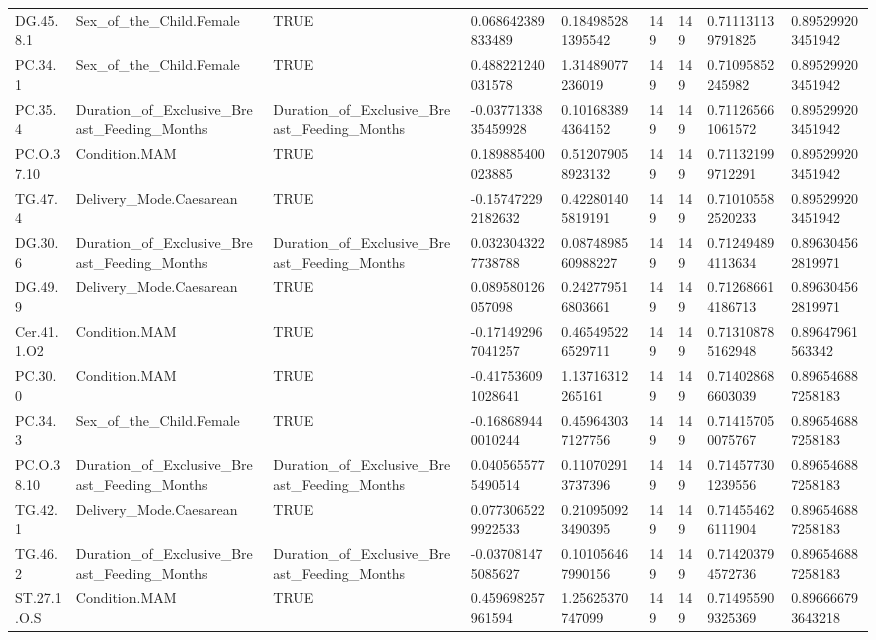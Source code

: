 \begin{longtable}{lllllllll}
DG.45.8.1 & Sex\_of\_the\_Child.Female & TRUE & 0.068642389833489 & 0.184985281395542 & 149 & 149 & 0.711131139791825 & 0.895299203451942 \\
PC.34.1 & Sex\_of\_the\_Child.Female & TRUE & 0.488221240031578 & 1.31489077236019 & 149 & 149 & 0.71095852245982 & 0.895299203451942 \\
PC.35.4 & Duration\_of\_Exclusive\_Breast\_Feeding\_Months & Duration\_of\_Exclusive\_Breast\_Feeding\_Months & -0.0377133835459928 & 0.101683894364152 & 149 & 149 & 0.711265661061572 & 0.895299203451942 \\
PC.O.37.10 & Condition.MAM & TRUE & 0.189885400023885 & 0.512079058923132 & 149 & 149 & 0.711321999712291 & 0.895299203451942 \\
TG.47.4 & Delivery\_Mode.Caesarean & TRUE & -0.157472292182632 & 0.422801405819191 & 149 & 149 & 0.710105582520233 & 0.895299203451942 \\
DG.30.6 & Duration\_of\_Exclusive\_Breast\_Feeding\_Months & Duration\_of\_Exclusive\_Breast\_Feeding\_Months & 0.0323043227738788 & 0.0874898560988227 & 149 & 149 & 0.712494894113634 & 0.896304562819971 \\
DG.49.9 & Delivery\_Mode.Caesarean & TRUE & 0.089580126057098 & 0.242779516803661 & 149 & 149 & 0.712686614186713 & 0.896304562819971 \\
Cer.41.1.O2 & Condition.MAM & TRUE & -0.171492967041257 & 0.465495226529711 & 149 & 149 & 0.713108785162948 & 0.89647961563342 \\
PC.30.0 & Condition.MAM & TRUE & -0.417536091028641 & 1.13716312265161 & 149 & 149 & 0.714028686603039 & 0.896546887258183 \\
PC.34.3 & Sex\_of\_the\_Child.Female & TRUE & -0.168689440010244 & 0.459643037127756 & 149 & 149 & 0.714157050075767 & 0.896546887258183 \\
PC.O.38.10 & Duration\_of\_Exclusive\_Breast\_Feeding\_Months & Duration\_of\_Exclusive\_Breast\_Feeding\_Months & 0.0405655775490514 & 0.110702913737396 & 149 & 149 & 0.714577301239556 & 0.896546887258183 \\
TG.42.1 & Delivery\_Mode.Caesarean & TRUE & 0.0773065229922533 & 0.210950923490395 & 149 & 149 & 0.714554626111904 & 0.896546887258183 \\
TG.46.2 & Duration\_of\_Exclusive\_Breast\_Feeding\_Months & Duration\_of\_Exclusive\_Breast\_Feeding\_Months & -0.037081475085627 & 0.101056467990156 & 149 & 149 & 0.714203794572736 & 0.896546887258183 \\
ST.27.1.O.S & Condition.MAM & TRUE & 0.459698257961594 & 1.25625370747099 & 149 & 149 & 0.714955909325369 & 0.896666793643218 \\

\end{longtable}
